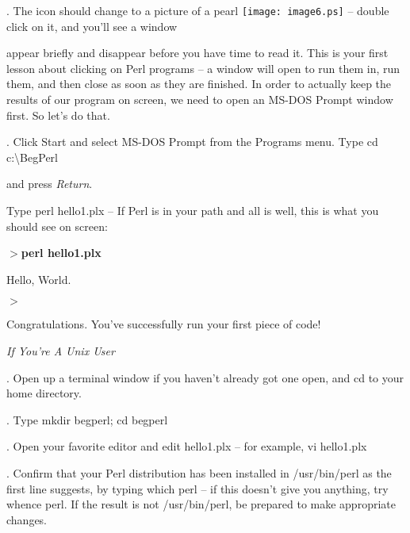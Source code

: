 \documentclass[a4paper,11pt]{book}
\begin{document}
\noindent 

\noindent 

.   The icon should change to a picture of a pearl \texttt{[image: image6.ps]} -- double click on it, and you'll see a window

\noindent appear briefly and disappear before you have time to read it. This is your first lesson about clicking on Perl programs -- a window will open to run them in, run them, and then close as soon as they are finished. In order to actually keep the results of our program on screen, we need to open an MS-DOS Prompt window first. So let's do that.

\noindent 

.   Click Start and select MS-DOS Prompt from the Programs menu. Type cd c:\textbackslash BegPerl

\noindent and press \textit{Return}.

\noindent 

\noindent Type perl hello1.plx -- If Perl is in your path and all is well, this is what you should see on screen:

\noindent 

\noindent $>$\textbf{perl hello1.plx}

\noindent Hello, World.

\noindent 

\noindent $>$

\noindent 

\noindent Congratulations. You've successfully run your first piece of code!

\noindent 

\noindent \textit{If You're A Unix User}

.   Open up a terminal window if you haven't already got one open, and cd to your home directory.

\noindent 

.   Type mkdir begperl; cd begperl

\noindent 

.   Open your favorite editor and edit hello1.plx -- for example, vi hello1.plx

\noindent 

.   Confirm that your Perl distribution has been installed in /usr/bin/perl as the first line suggests, by typing which perl -- if this doesn't give you anything, try whence perl. If the result is not /usr/bin/perl, be prepared to make appropriate changes.
\end{document}
